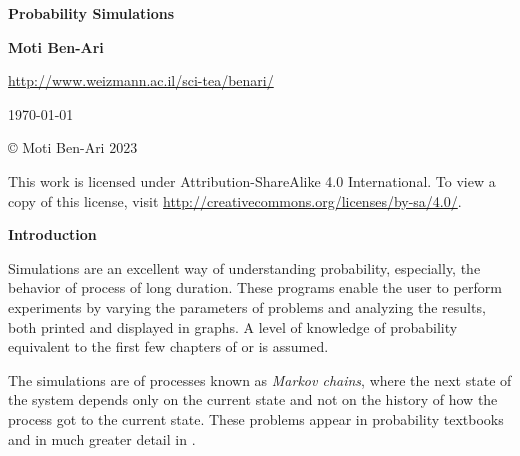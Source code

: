 

\thispagestyle{empty}

\begin{center}
\textbf{\LARGE Probability Simulations}

\bigskip
\bigskip
\bigskip

\textbf{\Large Moti Ben-Ari}

\bigskip

\url{http://www.weizmann.ac.il/sci-tea/benari/}

\bigskip
\bigskip
\bigskip

%

\today

\end{center}

\vfill

\begin{center}
\copyright{} Moti Ben-Ari $2023$
 \end{center}
 
\begin{small}
This work is licensed under Attribution-ShareAlike 4.0 International. To view a copy of this license, visit \url{http://creativecommons.org/licenses/by-sa/4.0/}.
\end{small}
\newpage

\tableofcontents

\newpage

\begin{center}
\textbf{\LARGE Introduction}
\end{center}


\bigskip

Simulations are an excellent way of understanding probability, especially, the behavior of process of long duration. These programs enable the user to perform experiments by varying the parameters of problems and analyzing the results, both printed and displayed in graphs. A level of knowledge of probability equivalent to the first few chapters of \cite{BW} or \cite{ross} is assumed.

The simulations are of processes known as \emph{Markov chains}, where the next state of the system depends only on the current state and not on the history of how the process got to the current state. These problems appear in probability textbooks \cite{BW, ross} and in much greater detail in \cite{mosteller, mos, border, privault}.

